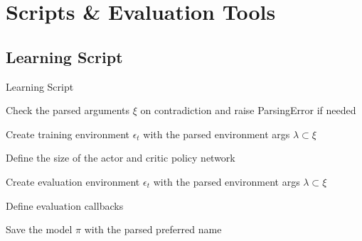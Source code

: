 

\newpage

\section{Scripts \& Evaluation Tools} \label{sec:scripts}



\subsection{Learning Script}
\begin{algorithm}
	\caption{Learning Script}
	\label{alg:learn}
	 
	 Check the parsed arguments $\xi$ on contradiction and raise ParsingError if needed
	 
	 Create training environment $\epsilon_t$ with the parsed environment args $\lambda \subset \xi$
	 
	 Define the size of the actor and critic policy network
	 
	 
	 Create evaluation environment $\epsilon_t$ with the parsed environment args $\lambda \subset \xi$
	 
	 Define evaluation callbacks
	 
	 
	 Save the model $\pi$ with the parsed preferred name
	 
	 
\end{algorithm}

\newpage

